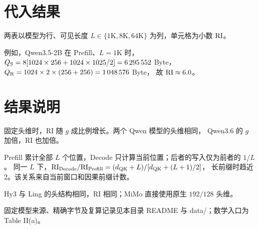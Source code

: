 \newpage
\section{代入结果}
两表以模型为行、可见长度 $L\in\{1\mathrm{K},8\mathrm{K},64\mathrm{K}\}$ 为列，单元格为小数 $\mathrm{RI}$。
\begin{center}\small\end{center}
\DisplayNote
例如，Qwen3.5-2B 在 Prefill、$L=1\mathrm{K}$ 时，
$Q_{\mathrm S}=8[1024\times256+1024\times1025/2]=6\,295\,552$ Byte，
$Q_{\mathrm R}=1024\times2\times(256+256)=1\,048\,576$ Byte，
故 $\mathrm{RI}\approx6.0$。

\section{结果说明}
固定头维时，RI 随 $g$ 成比例增长。两个 Qwen 模型的头维相同，
Qwen3.6 的 $g$ 加倍，RI 也加倍。

Prefill 累计全部 $L$ 个位置，Decode 只计算当前位置；后者的写入仅为前者的 $1/L$。
同一 $L$ 下，$\mathrm{RI}_{\rm Decode}/\mathrm{RI}_{\rm Prefill}=(d_{\rm QK}+L)/[d_{\rm QK}+(L+1)/2]$，
长前缀时趋近 2。该关系来自当前窗口和因果前缀计数。

Hy3 与 Ling 的头结构相同，RI 相同；MiMo 直接使用原生 $192/128$ 头维。
\par\smallskip\noindent\small
固定模型来源、精确字节及复算记录见本目录 README 与 data/；数学入口为 Table II(a)。

